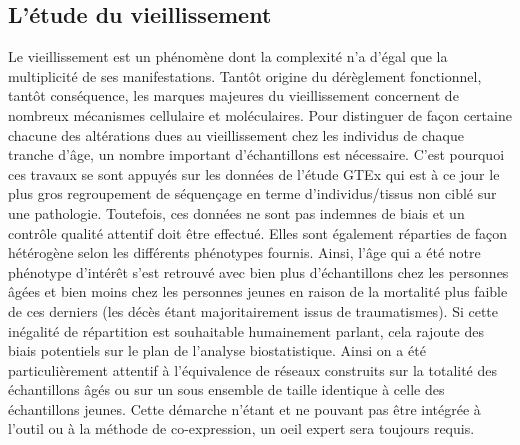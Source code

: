\subsection{L'étude du vieillissement}

Le vieillissement est un phénomène dont la complexité n'a d'égal que la multiplicité de ses manifestations. Tantôt origine du dérèglement fonctionnel, tantôt conséquence, les marques majeures du vieillissement concernent de nombreux mécanismes cellulaire et moléculaires. Pour distinguer de façon certaine chacune des altérations dues au vieillissement chez les individus de chaque tranche d'âge, un nombre important d'échantillons est nécessaire. C'est pourquoi ces travaux se sont appuyés sur les données de l'étude GTEx qui est à ce jour le plus gros regroupement de séquençage en terme d'individus/tissus non ciblé sur une pathologie. Toutefois, ces données ne sont pas indemnes de biais et un contrôle qualité attentif doit être effectué. Elles sont également réparties de façon hétérogène selon les différents phénotypes fournis. Ainsi, l'âge qui a été notre phénotype d'intérêt s'est retrouvé avec bien plus d'échantillons chez les personnes âgées et bien moins chez les personnes jeunes en raison de la mortalité plus faible de ces derniers (les décès étant majoritairement issus de traumatismes). Si cette inégalité de répartition est souhaitable humainement parlant, cela rajoute des biais potentiels sur le plan de l'analyse biostatistique. Ainsi on a été particulièrement attentif à l'équivalence de réseaux construits sur la totalité des échantillons âgés ou sur un sous ensemble de taille identique à celle des échantillons jeunes. Cette démarche n'étant et ne pouvant pas être intégrée à l'outil ou à la méthode de co-expression, un oeil expert sera toujours requis.

